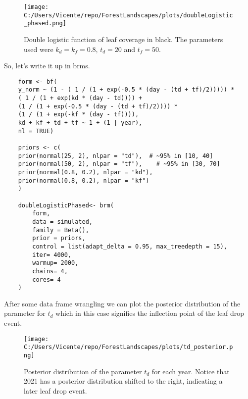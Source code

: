 \documentclass{article}
\begin{document}
\begin{figure}
    \centering
    \texttt{[image: C:/Users/Vicente/repo/ForestLandscapes/plots/doubleLogistic\_phased.png]}
    \caption{Double logistic function of leaf coverage in black. The parameters used were $k_d = k_f = 0.8$, $t_d = 20$ and $t_f = 50$.}
    \label{fig:double_logistic_leaf_coverage}
\end{figure}

So, let's write it up in brms.

\begin{verbatim}
    form <- bf(
    y_norm ~ (1 - ( 1 / (1 + exp(-0.5 * (day - (td + tf)/2))))) *
    ( 1 / (1 + exp(kd * (day - td)))) +
    (1 / (1 + exp(-0.5 * (day - (td + tf)/2)))) *
    (1 / (1 + exp(-kf * (day - tf)))),
    kd + kf + td + tf ~ 1 + (1 | year),
    nl = TRUE)

    priors <- c(
    prior(normal(25, 2), nlpar = "td"),  # ~95% in [10, 40]
    prior(normal(50, 2), nlpar = "tf"),    # ~95% in [30, 70]
    prior(normal(0.8, 0.2), nlpar = "kd"),
    prior(normal(0.8, 0.2), nlpar = "kf")
    )

    doubleLogisticPhased<- brm(
        form,
        data = simulated,
        family = Beta(),
        prior = priors,
        control = list(adapt_delta = 0.95, max_treedepth = 15),
        iter= 4000,
        warmup= 2000,
        chains= 4,
        cores= 4
    )
\end{verbatim}


After some data frame wrangling we can plot the posterior distribution of the parameter
for $t_d$ which in this case signifies the inflection point of the leaf drop event.

\begin{figure}
    \centering
    \texttt{[image: C:/Users/Vicente/repo/ForestLandscapes/plots/td\_posterior.png]}
    \caption{Posterior distribution of the parameter $t_d$ for each year. Notice that 2021 has a posterior distribution shifted to the right, indicating a later leaf drop event.}
    \label{fig:td_posterior}
\end{figure}
\end{document}
